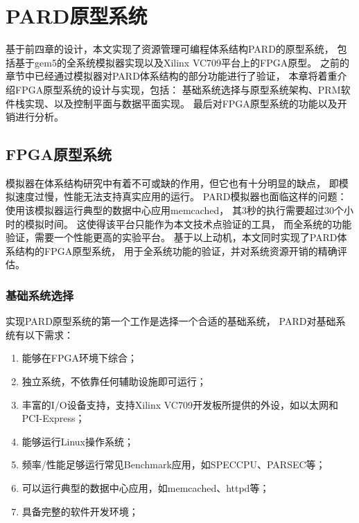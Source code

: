

\chapter{PARD原型系统}
\label{chap:impl}

基于前四章的设计，本文实现了资源管理可编程体系结构PARD的原型系统，
包括基于gem5的全系统模拟器实现以及Xilinx VC709平台上的FPGA原型。
之前的章节中已经通过模拟器对PARD体系结构的部分功能进行了验证，
本章将着重介绍FPGA原型系统的设计与实现，包括：
基础系统选择与原型系统架构、PRM软件栈实现、以及控制平面与数据平面实现。
最后对FPGA原型系统的功能以及开销进行分析。


\section{FPGA原型系统}

模拟器在体系结构研究中有着不可或缺的作用，但它也有十分明显的缺点，
即模拟速度过慢，性能无法支持真实应用的运行。
PARD模拟器也面临这样的问题：
使用该模拟器运行典型的数据中心应用memcached，
其3秒的执行需要超过30个小时的模拟时间。
这使得该平台只能作为本文技术点验证的工具，
而全系统的功能验证，需要一个性能更高的实验平台。
基于以上动机，本文同时实现了PARD体系结构的FPGA原型系统，
用于全系统功能的验证，并对系统资源开销的精确评估。

\subsection{基础系统选择}

实现PARD原型系统的第一个工作是选择一个合适的基础系统，
PARD对基础系统有以下需求：

\begin{enumerate}[leftmargin=2\parindent, nolistsep, label=\arabic*）]
  \item 能够在FPGA环境下综合；
  \item 独立系统，不依靠任何辅助设施即可运行；
  \item 丰富的I/O设备支持，支持Xilinx VC709开发板所提供的外设，如以太网和PCI-Express；
  \item 能够运行Linux操作系统；
  \item 频率/性能足够运行常见Benchmark应用，如SPECCPU、PARSEC等；
  \item 可以运行典型的数据中心应用，如memcached、httpd等；
  \item 具备完整的软件开发环境；
\end{enumerate}

